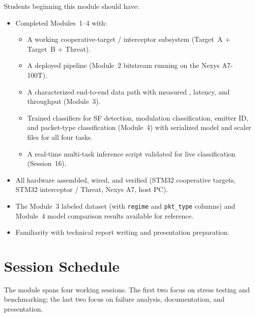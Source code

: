 \documentclass[11pt,letterpaper]{article}
\begin{document}
	Students beginning this module should have:
	\begin{itemize}[leftmargin=2em]
		\item Completed Modules~1--4 with:
		\begin{itemize}
			\item A working cooperative-target / interceptor \RF{} subsystem (Target~A + Target~B + Threat).
			\item A deployed \FPGA{} pipeline (Module~2 bitstream running on the Nexys A7-100T).
			\item A characterized end-to-end data path with measured \PER{}, latency, and throughput (Module~3).
			\item Trained classifiers for SF detection, modulation classification, emitter ID, and packet-type classification (Module~4) with serialized model and scaler files for all four tasks.
			\item A real-time multi-task inference script validated for live classification (Session~16).
		\end{itemize}
		\item All hardware assembled, wired, and verified (STM32 cooperative targets, STM32 interceptor / Threat, Nexys A7, host PC).
		\item The Module~3 labeled dataset (with \texttt{regime} and \texttt{pkt\_type} columns) and Module~4 model comparison results available for reference.
		\item Familiarity with technical report writing and presentation preparation.
	\end{itemize}

	\newpage
	\section{Session Schedule}

	The module spans four working sessions. The first two focus on stress testing and benchmarking; the last two focus on failure analysis, documentation, and presentation.
\end{document}
